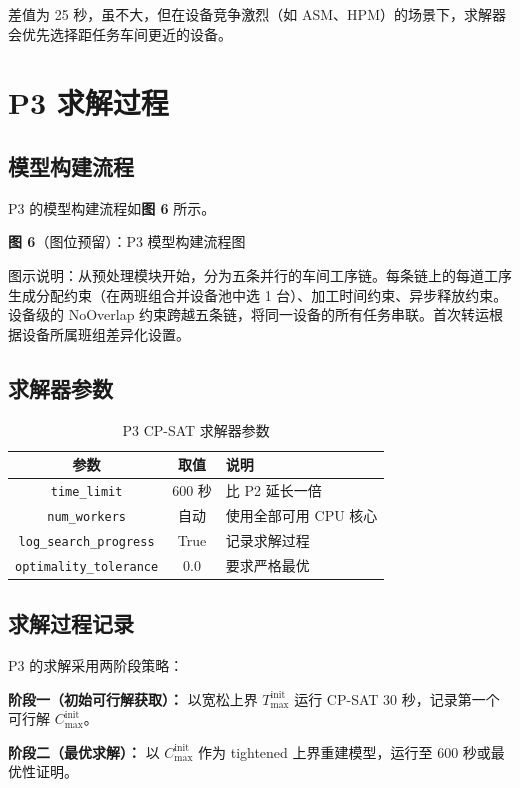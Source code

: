 \documentclass[UTF8,a4paper,12pt]{ctexart}
\begin{document}
差值为 25 秒，虽不大，但在设备竞争激烈（如 ASM、HPM）的场景下，求解器会优先选择距任务车间更近的设备。

\section{P3 求解过程}
\subsection{模型构建流程}
P3 的模型构建流程如\textbf{图 6} 所示。

\begin{center}
\textbf{图 6}（图位预留）：P3 模型构建流程图

图示说明：从预处理模块开始，分为五条并行的车间工序链。每条链上的每道工序生成分配约束（在两班组合并设备池中选 1 台）、加工时间约束、异步释放约束。设备级的 NoOverlap 约束跨越五条链，将同一设备的所有任务串联。首次转运根据设备所属班组差异化设置。
\end{center}

\subsection{求解器参数}
\begin{table}[htbp]
  \centering
  \caption{P3 CP-SAT 求解器参数}
  \label{tab:p3_solver_param}
  \begin{tabular}{ccl}
    \toprule
    参数 & 取值 & 说明 \\
    \midrule
    \texttt{time\_limit} & 600 秒 & 比 P2 延长一倍 \\
    \texttt{num\_workers} & 自动 & 使用全部可用 CPU 核心 \\
    \texttt{log\_search\_progress} & True & 记录求解过程 \\
    \texttt{optimality\_tolerance} & 0.0 & 要求严格最优 \\
    \bottomrule
  \end{tabular}
\end{table}

\subsection{求解过程记录}
P3 的求解采用两阶段策略：

\textbf{阶段一（初始可行解获取）：} 以宽松上界 $T_{\max}^{\text{init}}$ 运行 CP-SAT 30 秒，记录第一个可行解 $C_{\max}^{\text{init}}$。

\textbf{阶段二（最优求解）：} 以 $C_{\max}^{\text{init}}$ 作为 tightened 上界重建模型，运行至 600 秒或最优性证明。
\end{document}
